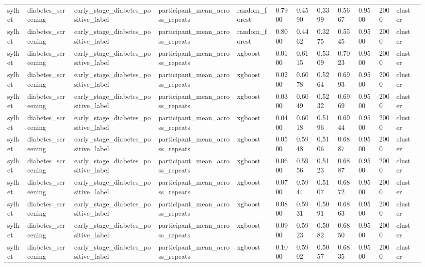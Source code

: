 \begin{tabular}{lllllllllllll}
sylhet & diabetes\_screening & early\_stage\_diabetes\_positive\_label & participant\_mean\_across\_repeats & random\_forest & 0.7900 & 0.4590 & 0.3399 & 0.5667 & 0.9500 & 2000 & cluster &  \\
sylhet & diabetes\_screening & early\_stage\_diabetes\_positive\_label & participant\_mean\_across\_repeats & random\_forest & 0.8000 & 0.4462 & 0.3275 & 0.5545 & 0.9500 & 2000 & cluster &  \\
sylhet & diabetes\_screening & early\_stage\_diabetes\_positive\_label & participant\_mean\_across\_repeats & xgboost & 0.0100 & 0.6115 & 0.5309 & 0.7023 & 0.9500 & 2000 & cluster &  \\
sylhet & diabetes\_screening & early\_stage\_diabetes\_positive\_label & participant\_mean\_across\_repeats & xgboost & 0.0200 & 0.6078 & 0.5264 & 0.6993 & 0.9500 & 2000 & cluster &  \\
sylhet & diabetes\_screening & early\_stage\_diabetes\_positive\_label & participant\_mean\_across\_repeats & xgboost & 0.0300 & 0.6049 & 0.5232 & 0.6969 & 0.9500 & 2000 & cluster &  \\
sylhet & diabetes\_screening & early\_stage\_diabetes\_positive\_label & participant\_mean\_across\_repeats & xgboost & 0.0400 & 0.6018 & 0.5196 & 0.6944 & 0.9500 & 2000 & cluster &  \\
sylhet & diabetes\_screening & early\_stage\_diabetes\_positive\_label & participant\_mean\_across\_repeats & xgboost & 0.0500 & 0.5948 & 0.5106 & 0.6887 & 0.9500 & 2000 & cluster &  \\
sylhet & diabetes\_screening & early\_stage\_diabetes\_positive\_label & participant\_mean\_across\_repeats & xgboost & 0.0600 & 0.5956 & 0.5123 & 0.6887 & 0.9500 & 2000 & cluster &  \\
sylhet & diabetes\_screening & early\_stage\_diabetes\_positive\_label & participant\_mean\_across\_repeats & xgboost & 0.0700 & 0.5944 & 0.5107 & 0.6872 & 0.9500 & 2000 & cluster &  \\
sylhet & diabetes\_screening & early\_stage\_diabetes\_positive\_label & participant\_mean\_across\_repeats & xgboost & 0.0800 & 0.5931 & 0.5091 & 0.6863 & 0.9500 & 2000 & cluster &  \\
sylhet & diabetes\_screening & early\_stage\_diabetes\_positive\_label & participant\_mean\_across\_repeats & xgboost & 0.0900 & 0.5923 & 0.5082 & 0.6850 & 0.9500 & 2000 & cluster &  \\
sylhet & diabetes\_screening & early\_stage\_diabetes\_positive\_label & participant\_mean\_across\_repeats & xgboost & 0.1000 & 0.5902 & 0.5057 & 0.6835 & 0.9500 & 2000 & cluster &  \\

\end{tabular}

